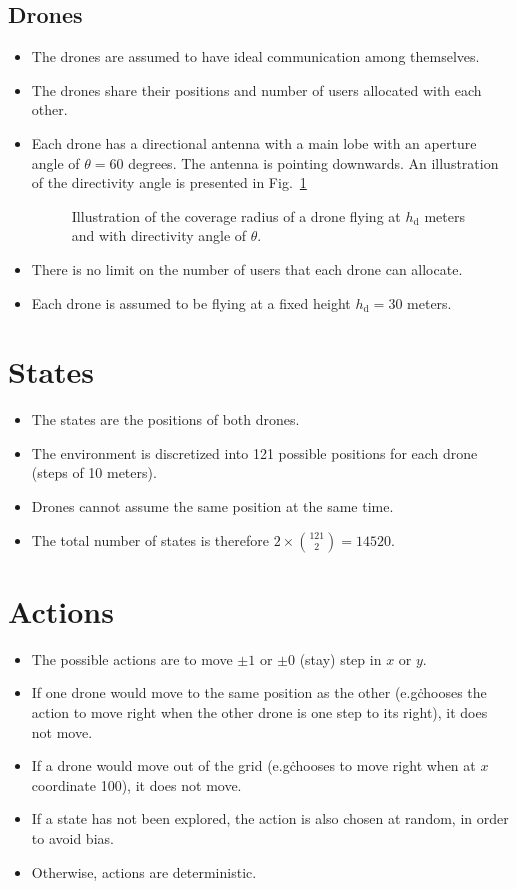 \documentclass{IEEEtran}
\begin{document}
\subsection{Drones}
\begin{itemize}
    \item The drones are assumed to have ideal communication among themselves.
    \item The drones share their positions and number of users allocated with each other.
    \item Each drone has a directional antenna with a main lobe with an aperture angle of $\theta=60$ degrees. The antenna is pointing downwards. An illustration of the directivity angle is presented in Fig.~\ref{fig:angle}
        \begin{figure}
            \centering
            \resizebox{.5\columnwidth}{!}{}
            \caption{Illustration of the coverage radius of a drone flying at $h_\text{d}$ meters and with directivity angle of $\theta$.}\label{fig:angle}
        \end{figure}
    \item There is no limit on the number of users that each drone can allocate.
    \item Each drone is assumed to be flying at a fixed height ${h_\text{d} = 30}$ meters.
\end{itemize}
\section{States}
\begin{itemize}
    \item The states are the positions of both drones.
    \item The environment is discretized into 121 possible positions for each drone (steps of 10 meters).
    \item Drones cannot assume the same position at the same time.
    \item The total number of states is therefore $2 \times \binom{121}{2} = 14520$.
\end{itemize}
\section{Actions}
\begin{itemize}
    \item The possible actions are to move $\pm 1$ or $\pm 0$ (stay) step in $x$ or $y$.
    \item If one drone would move to the same position as the other (e.g\. chooses the action to move right when the other drone is one step to its right), it does not move.
    \item If a drone would move out of the grid (e.g\. chooses to move right when at $x$ coordinate 100), it does not move.
    \item If a state has not been explored, the action is also chosen at random, in order to avoid bias.
    \item Otherwise, actions are deterministic.
\end{itemize}
\end{document}
